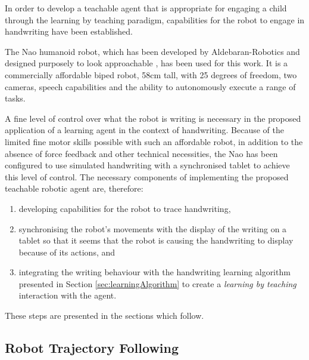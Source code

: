 \documentclass{sig-alternate}
\begin{document}
In order to develop a teachable agent that is appropriate for engaging a child
through the learning by teaching paradigm, 
capabilities for the robot to engage in handwriting have been established.

The Nao humanoid robot, which has been developed by Aldebaran-Robotics and
designed purposely to look approachable \cite{Gouaillier2008}, has been used for
this work. It is a commercially affordable biped robot, 58cm tall, with 25
degrees of freedom, two cameras, speech capabilities and the ability to
autonomously execute a range of tasks.

A fine level of control over what the robot is writing is necessary in the
proposed application of a learning agent in the context of handwriting. Because
of the limited fine motor skills possible with such an affordable robot, in
addition to the absence of force feedback and other technical necessities, the
Nao has been configured to use simulated handwriting with a synchronised tablet
to achieve this level of control. The necessary components of implementing the
proposed teachable robotic agent are, therefore:

\begin{enumerate}
    \item developing capabilities for the robot to trace handwriting, 

    \item synchronising the robot's movements with the display of the writing on a
        tablet so that it seems that the robot is causing the handwriting to
        display because of its actions, and

    \item integrating the writing behaviour with the handwriting learning
        algorithm presented in Section \ref{sec:learningAlgorithm} to create a
        \emph{learning by teaching} interaction with the agent. 
\end{enumerate}

These steps are presented in the sections which follow.

\subsection{Robot Trajectory Following}
\end{document}
